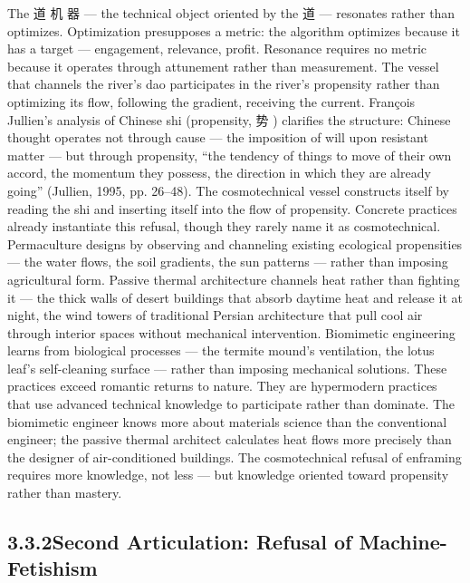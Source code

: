 The 道 机 器 — the technical object oriented by the 道 — resonates rather than optimizes. Optimization presupposes a metric: the algorithm optimizes because it has a target — engagement, relevance, profit. Resonance requires no metric because it operates through attunement rather than measurement. The vessel that channels the river’s dao participates in the river’s propensity rather than optimizing its flow, following the gradient, receiving the current. François Jullien’s analysis of Chinese shi (propensity, 势 ) clarifies the structure: Chinese thought operates not through cause — the imposition of will upon resistant matter — but through propensity, “the tendency of things to move of their own accord, the momentum they possess, the direction in which they are already going” (Jullien, 1995, pp. 26–48). The cosmotechnical vessel constructs itself by reading the shi and inserting itself into the flow of propensity. Concrete practices already instantiate this refusal, though they rarely name it as cosmotechnical. Permaculture designs by observing and channeling existing ecological propensities — the water flows, the soil gradients, the sun patterns — rather than imposing agricultural form. Passive thermal architecture channels heat rather than fighting it — the thick walls of desert buildings that absorb daytime heat and release it at night, the wind towers of traditional Persian architecture that pull cool air through interior spaces without mechanical intervention. Biomimetic engineering learns from biological processes — the termite mound’s ventilation, the lotus leaf’s self-cleaning surface — rather than imposing mechanical solutions. These practices exceed romantic returns to nature. They are hypermodern practices that use advanced technical knowledge to participate rather than dominate. The biomimetic engineer knows more about materials science than the conventional engineer; the passive thermal architect calculates heat flows more precisely than the designer of air-conditioned buildings. The cosmotechnical refusal of enframing requires more knowledge, not less — but knowledge oriented toward propensity rather than mastery.

\subsection{3.3.2\quad Second Articulation: Refusal of Machine-Fetishism}

